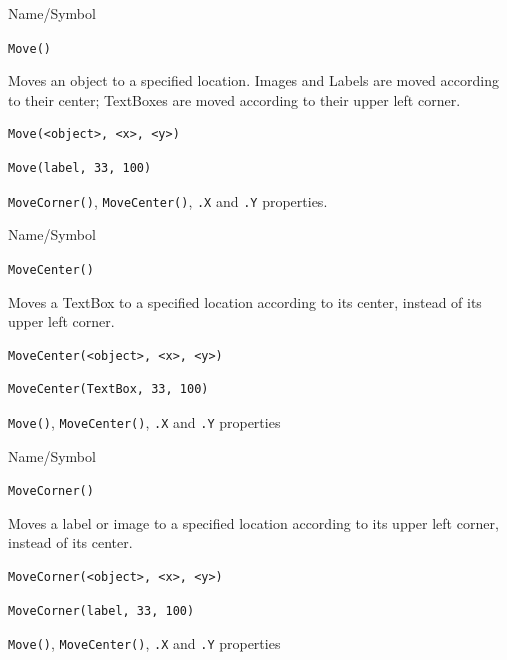 \begin{desc}{Name/Symbol}
\item[Name/Symbol]	\verb+Move()+

\item[Description]	Moves an object to a specified location.  
		Images and Labels are moved according to their center; 
		TextBoxes are moved according to their upper left corner.

\item[Usage]
\begin{verbatim}
Move(<object>, <x>, <y>)
\end{verbatim}

\item[Example]	
\begin{verbatim}
Move(label, 33, 100)
\end{verbatim}

\item[See Also]	\verb+MoveCorner()+, \verb+MoveCenter()+, \verb+.X+ and \verb+.Y+ properties.
\end{desc}
\begin{desc}{Name/Symbol}
\item[Name/Symbol]	\verb+MoveCenter()+

\item[Description]	Moves a TextBox to a specified location
		according to its center, instead of its upper left corner.

\item[Usage]
\begin{verbatim}
MoveCenter(<object>, <x>, <y>)
\end{verbatim}

\item[Example]	
\begin{verbatim}
MoveCenter(TextBox, 33, 100)
\end{verbatim}

\item[See Also]	\verb+Move()+, \verb+MoveCenter()+, \verb+.X+ and \verb+.Y+ properties
\end{desc}

\begin{desc}{Name/Symbol}
\item[Name/Symbol]	\verb+MoveCorner()+

\item[Description]	Moves a label or image to a specified location
		according to its upper left corner, instead of its center. 

\item[Usage]
\begin{verbatim}
MoveCorner(<object>, <x>, <y>)
\end{verbatim}

\item[Example]	
\begin{verbatim}
MoveCorner(label, 33, 100)
\end{verbatim}

\item[See Also]	\verb+Move()+, \verb+MoveCenter()+, \verb+.X+ and \verb+.Y+ properties
\end{desc}



